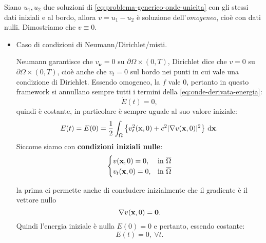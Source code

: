 \begin{dimostrazione}
    Siano $u_{1} ,u_{2}$ due soluzioni di \eqref{eq:problema-generico-onde-unicita} con gli stessi dati iniziali e al bordo, allora $v=u_{1} -u_{2}$ è soluzione dell'\textit{omogeneo}, cioè con dati nulli. Dimostriamo che $v\equiv 0$.
    \begin{itemize}
        \item Caso di condizioni di Neumann/Dirichlet/misti.

              Neumann garantisce che $v_{\bm{\nu }} =0$ su $\partial \Omega \times (0,T)$, Dirichlet dice che $v=0$ su $\partial \Omega \times (0,T)$, cioè anche che $v_{t} =0$ sul bordo nei punti in cui vale una condizione di Dirichlet. Essendo omogeneo, la $f$ vale $0$, pertanto in questo framework si annullano sempre tutti i termini della \eqref{eq:onde-derivata-energia}:
              \begin{equation*}
                  \dot{E}(t) =0,
              \end{equation*}quindi è costante, in particolare è sempre uguale al suo valore iniziale:
              \begin{equation*}
                  E(t) =E(0) =\frac{1}{2}\int _{\Omega }\left\{v_{t}^{2}(\mathbf{x} ,0) +c^{2}| \nabla v(\mathbf{x} ,0)| ^{2}\right\} \,\mathrm d \mathbf{x} .
              \end{equation*}Siccome siamo con \textbf{condizioni iniziali nulle}:
              \begin{equation*}
                  \begin{cases}
                      v(\x ,0) =0,     & \text{in} \ \overline{\Omega } \\
                      v_{t}(\x ,0) =0, & \text{in} \ \overline{\Omega }
                  \end{cases}
              \end{equation*}

              la prima ci permette anche di concludere inizialmente che il gradiente è il vettore nullo
              \begin{equation*}
                  \nabla v(\mathbf{x} ,0) =\mathbf{0} .
              \end{equation*}Quindi l'energia iniziale è nulla $E(0) =0$ e pertanto, essendo costante:
              \begin{equation*}
                  E(t) =0,\ \forall t.
              \end{equation*}


\end{itemize}
\end{dimostrazione}
